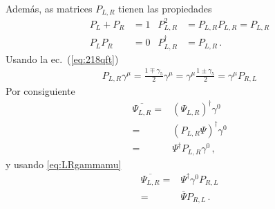 \begin{frame}
Además,
as matrices $P_{L,R}$ tienen las propiedades
\begin{align}
  P_L+P_R&=1 & P_{L,R}^2&=P_{L,R}P_{L,R}=P_{L,R}\nonumber\\
  P_L P_R&=0& P_{L,R}^\dagger&=P_{L,R}\,.
\end{align}
Usando la ec.~(\ref{eq:218qft})
\begin{align}
  \label{eq:LRgammamu}
  P_{L,R}\gamma^\mu=\frac{1\mp\gamma_5}{2}\gamma^\mu=\gamma^\mu\frac{1\pm\gamma_5}{2}=\gamma^\mu P_{R,L}
\end{align}
Por consiguiente
\begin{align}
  \overline{\Psi_{L,R}}=&\left(\Psi_{L,R} \right)^{\dagger}\gamma^0 \nonumber\\
  =&\left(P_{L,R}\Psi \right)^{\dagger}\gamma^0 \nonumber\\
  =&\Psi^{\dagger}P_{L,R}\gamma^0 \,,
\end{align}
y usando \eqref{eq:LRgammamu}
\begin{align}
  \overline{\Psi_{L,R}}=& \Psi^{\dagger}\gamma^0 P_{R,L} \nonumber\\
=&\overline{\Psi} P_{R,L}\,.
\end{align}





\end{frame}
